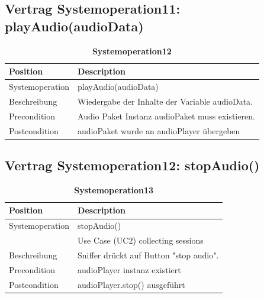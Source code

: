 \documentclass[a4,12pt]{scrartcl}
\begin{document}
\subsection{Vertrag Systemoperation11: playAudio(audioData)}
\begin{table}[H]
\centering
    \begin{tabular}{@{} l l@{}}    
    {Position} & {Description}\\ \midrule
   	Systemoperation & playAudio(audioData)\\ \addlinespace
   	Beschreibung & Wiedergabe der Inhalte der Variable audioData. \\ \addlinespace
   	Precondition & Audio Paket Instanz audioPaket muss existieren.\\ \addlinespace
	Postcondition & audioPaket wurde an audioPlayer übergeben\\ \bottomrule
    \end{tabular}
\caption{\textbf{Systemoperation12}}
\end{table} 
\subsection{Vertrag Systemoperation12: stopAudio()}
\begin{table}[H]
\centering
    \begin{tabular}{@{} l l@{}}    
    {Position} & {Description}\\ \midrule
   	Systemoperation & stopAudio()\\ \addlinespace
   	& Use Case (UC2) collecting sessions \\ \addlinespace
   	Beschreibung & Sniffer drückt auf Button "stop audio".\\ \addlinespace
   	Precondition & audioPlayer instanz existiert\\ \addlinespace
	Postcondition & audioPlayer.stop() ausgeführt\\ \bottomrule
    \end{tabular}
\caption{\textbf{Systemoperation13}}
\end{table}
\end{document}
